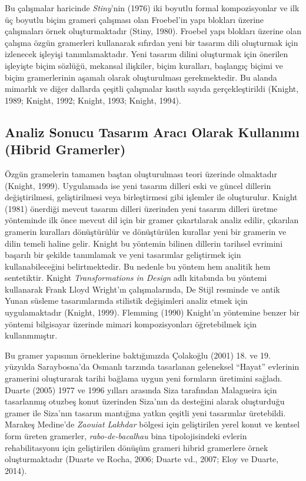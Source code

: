 \documentclass[12pt,turkish,a4paperpaper,]{report}
\begin{document}
Bu çalışmalar haricinde \emph{Stiny}'nin (1976) iki boyutlu formal
kompozisyonlar ve ilk üç boyutlu biçim grameri çalışması olan Froebel'in
yapı blokları üzerine çalışmaları örnek oluşturmaktadır (Stiny, 1980).
Froebel yapı blokları üzerine olan çalışma özgün gramerleri kullanarak
sıfırdan yeni bir tasarım dili oluşturmak için izlenecek işleyişi
tanımlamaktadır. Yeni tasarım dilini oluşturmak için önerilen işleyişte
biçim sözlüğü, mekansal ilişkiler, biçim kuralları, başlangıç biçimi ve
biçim gramerlerinin aşamalı olarak oluşturulması gerekmektedir. Bu
alanda mimarlık ve diğer dallarda çeşitli çalışmalar kısıtlı sayıda
gerçekleştirildi (Knight, 1989; Knight, 1992; Knight, 1993; Knight,
1994).

\hypertarget{analiz-sonucu-tasarux131m-aracux131-olarak-kullanux131mux131-hibrid-gramerler}{%
\subsection{Analiz Sonucu Tasarım Aracı Olarak Kullanımı (Hibrid
Gramerler)}\label{analiz-sonucu-tasarux131m-aracux131-olarak-kullanux131mux131-hibrid-gramerler}}

Özgün gramelerin tamamen baştan oluşturulması teori üzerinde olmaktadır
(Knight, 1999). Uygulamada ise yeni tasarım dilleri eski ve güncel
dillerin değiştirilmesi, geliştirilmesi veya birleştirmesi gibi işlemler
ile oluşturulur. Knight (1981) önerdiği mevcut tasarım dilleri üzerinden
yeni tasarım dilleri üretme yönteminde ilk önce mevcut dil için bir
gramer çıkartılarak analiz edilir, çıkarılan gramerin kuralları
dönüştürülür ve dönüştürülen kurallar yeni bir gramerin ve dilin temeli
haline gelir. Knight bu yöntemin bilinen dillerin tarihsel evrimini
başarılı bir şekilde tanımlamak ve yeni tasarımlar geliştirmek için
kullanabileceğini belirtmektedir. Bu nedenle bu yöntem hem analitik hem
sentetiktir. Knight \emph{Transformations in Design} adlı kitabında bu
yöntemi kullanarak Frank Lloyd Wright'ın çalışmalarında, De Stijl
resminde ve antik Yunan süsleme tasarımlarında stilistik değişimleri
analiz etmek için uygulamaktadır (Knight, 1999). Flemming (1990)
Knight'ın yöntemine benzer bir yöntemi bilgisayar üzerinde mimari
kompozisyonları öğretebilmek için kullanmmıştır.

Bu gramer yapısının örneklerine baktığımızda Çolakoğlu (2001) 18. ve 19.
yüzyılda Saraybosna'da Osmanlı tarzında tasarlanan geleneksel ``Hayat''
evlerinin gramerini oluşturarak tarihi bağlama uygun yeni formların
üretimini sağladı. Duarte (2005) 1977 ve 1996 yılları arasında Siza
tarafından Malagueira için tasarlanmış otuzbeş konut üzerinden Siza'nın
da desteğini alarak oluşturduğu gramer ile Siza'nın tasarım mantığına
yatkın çeşitli yeni tasarımlar üretebildi. Marakeş Medine'de
\emph{Zaouiat Lakhdar} bölgesi için geliştirilen yerel konut ve kentsel
form üreten gramerler, \emph{rabo-de-bacalhau} bina tipolojisindeki
evlerin rehabilitasyonu için geliştirilen dönüşüm grameri hibrid
gramerlere örnek oluşturmaktadır (Duarte ve Rocha, 2006; Duarte vd.,
2007; Eloy ve Duarte, 2014).
\end{document}
